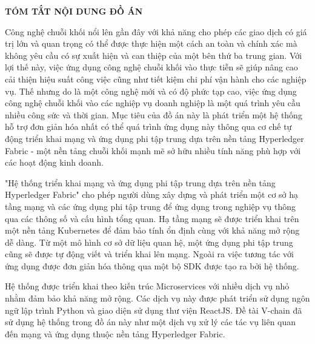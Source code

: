\documentclass[../DoAn.tex]{subfiles}
\begin{document}
\begin{center}
    \Large{\textbf{TÓM TẮT NỘI DUNG ĐỒ ÁN}}\\
\end{center}
\vspace{1cm}

Công nghệ chuỗi khối nổi lên gần đây với khả năng cho phép các giao dịch có giá trị lớn và quan trọng có thể được thực hiện một cách an toàn và chính xác mà không yêu cầu có sự xuất hiện và can thiệp của một bên thứ ba trung gian. Với lợi thế này, việc ứng dụng công nghệ chuỗi khối vào thực tiễn sẽ giúp nâng cao cải thiện hiệu suất công việc cũng như tiết kiệm chi phí vận hành cho các nghiệp vụ. Thế nhưng do là một công nghệ mới và có độ phức tạp cao, việc ứng dụng công nghệ chuỗi khối vào các nghiệp vụ doanh nghiệp là một quá trình yêu cầu nhiều công sức và thời gian. Mục tiêu của đồ án này là phát triển một hệ thống hỗ trợ đơn giản hóa nhất có thể quá trình ứng dụng này thông qua cơ chế tự động triển khai mạng và ứng dụng phi tập trung dựa trên nền tảng Hyperledger Fabric - một nền tảng chuỗi khối mạnh mẽ sở hữu nhiều tính năng phù hợp với các hoạt động kinh doanh.

"Hệ thống triển khai mạng và ứng dụng phi tập trung dựa trên nền tảng Hyperledger Fabric" cho phép người dùng xây dựng và phát triển một cơ sở hạ tầng mạng và các ứng dụng phi tập trung để ứng dụng trong nghiệp vụ thông qua các thông số và cấu hình tổng quan. Hạ tầng mạng sẽ được triển khai trên một nền tảng Kubernetes để đảm bảo tính ổn định cùng với khả năng mở rộng dễ dàng. Từ một mô hình cơ sở dữ liệu quan hệ, một ứng dụng phi tập trung cũng sẽ được tự động viết và triển khai lên mạng. Ngoài ra việc tương tác với ứng dụng được đơn giản hóa thông qua một bộ SDK được tạo ra bởi hệ thống.

Hệ thống được triển khai theo kiến trúc Microservices với nhiều dịch vụ nhỏ nhằm đảm bảo khả năng mở rộng. Các dịch vụ này được phát triển sử dụng ngôn ngữ lập trình Python và giao diện sử dụng thư viện ReactJS. Đề tài V-chain\cite{vchain} đã sử dụng hệ thống trong đồ án này như một dịch vụ xử lý các tác vụ liên quan đến mạng và ứng dụng thuộc nền tảng Hyperledger Fabric.
\end{document}
